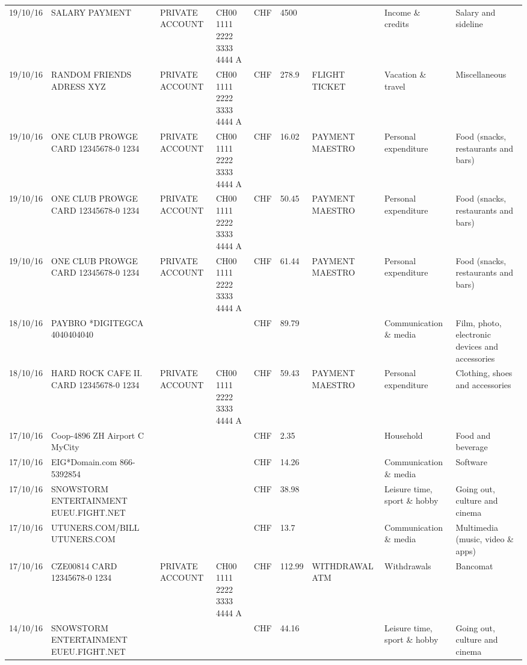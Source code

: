 \begin{landscape}
\begin{center}
\begin{longtable}{lllllllll}
		19/10/16 & SALARY PAYMENT & PRIVATE ACCOUNT & CH00 1111 2222 3333 4444 A & CHF   & 4500  &       & Income \& credits & Salary and sideline \\
		19/10/16 & RANDOM FRIENDS ADRESS XYZ & PRIVATE ACCOUNT & CH00 1111 2222 3333 4444 A & CHF   & 278.9 & FLIGHT TICKET & Vacation \& travel & Miscellaneous \\
		19/10/16 & ONE CLUB PROWGE CARD 12345678-0 1234 & PRIVATE ACCOUNT & CH00 1111 2222 3333 4444 A & CHF   & 16.02 & PAYMENT MAESTRO & Personal expenditure & Food (snacks, restaurants and bars) \\
		19/10/16 & ONE CLUB PROWGE CARD 12345678-0 1234 & PRIVATE ACCOUNT & CH00 1111 2222 3333 4444 A & CHF   & 50.45 & PAYMENT MAESTRO & Personal expenditure & Food (snacks, restaurants and bars) \\
		19/10/16 & ONE CLUB PROWGE CARD 12345678-0 1234 & PRIVATE ACCOUNT & CH00 1111 2222 3333 4444 A & CHF   & 61.44 & PAYMENT MAESTRO & Personal expenditure & Food (snacks, restaurants and bars) \\
		18/10/16 & PAYBRO *DIGITEGCA      4040404040 &       &       & CHF   & 89.79 &       & Communication \& media & Film, photo, electronic devices and accessories \\
		18/10/16 & HARD ROCK CAFE II. CARD 12345678-0 1234 & PRIVATE ACCOUNT & CH00 1111 2222 3333 4444 A & CHF   & 59.43 & PAYMENT MAESTRO & Personal expenditure & Clothing, shoes and accessories \\
		17/10/16 & Coop-4896 ZH Airport C   MyCity &       &       & CHF   & 2.35  &       & Household & Food and beverage \\
		17/10/16 & EIG*Domain.com           866-5392854 &       &       & CHF   & 14.26 &       & Communication \& media & Software \\
		17/10/16 & SNOWSTORM ENTERTAINMENT EUEU.FIGHT.NET &       &       & CHF   & 38.98 &       & Leisure time, sport \& hobby & Going out, culture and cinema \\
		17/10/16 & UTUNERS.COM/BILL          UTUNERS.COM &       &       & CHF   & 13.7  &       & Communication \& media & Multimedia (music, video \& apps) \\
		17/10/16 & CZE00814 CARD 12345678-0 1234 & PRIVATE ACCOUNT & CH00 1111 2222 3333 4444 A & CHF   & 112.99 & WITHDRAWAL ATM & Withdrawals & Bancomat \\
		14/10/16 & SNOWSTORM ENTERTAINMENT EUEU.FIGHT.NET &       &       & CHF   & 44.16 &       & Leisure time, sport \& hobby & Going out, culture and cinema \\

\end{longtable}
\end{center}
\end{landscape}
